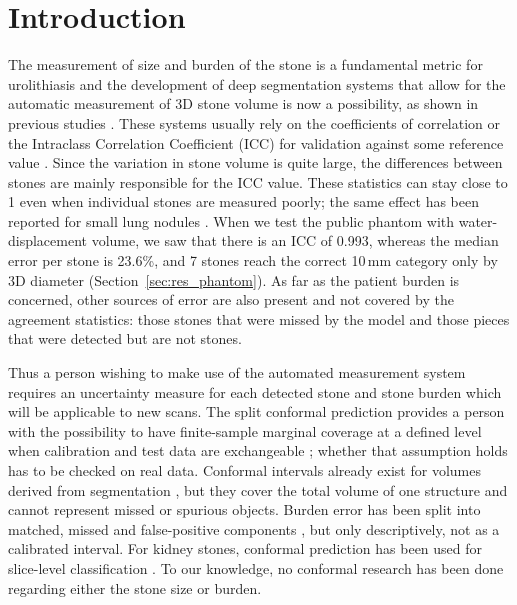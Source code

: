 \documentclass[conference]{IEEEtran}
\begin{document}
\section{Introduction}
The measurement of size and burden of the stone is a fundamental metric for urolithiasis and the development of deep segmentation systems that allow for the automatic measurement of 3D stone volume is now a possibility, as shown in previous studies \cite{elton2022,li2022,cumpanas2024,mukherjee2023}. These systems usually rely on the coefficients of correlation or the Intraclass Correlation Coefficient (ICC) for validation against some reference value \cite{neubauer2023,wilhelm2018,elton2022}. Since the variation in stone volume is quite large, the differences between stones are mainly responsible for the ICC value. These statistics can stay close to 1 even when individual stones are measured poorly; the same effect has been reported for small lung nodules \cite{xie2013}. When we test the public phantom with water-displacement volume, we saw that there is an ICC of 0.993, whereas the median error per stone is 23.6\%, and 7 stones reach the correct 10\,mm category only by 3D diameter (Section~\ref{sec:res_phantom}). As far as the patient burden is concerned, other sources of error are also present and not covered by the agreement statistics: those stones that were missed by the model and those pieces that were detected but are not stones.

Thus a person wishing to make use of the automated measurement system requires an uncertainty measure for each detected stone and stone burden which will be applicable to new scans. The split conformal prediction provides a person with the possibility to have finite-sample marginal coverage at a defined level when calibration and test data are exchangeable \cite{vovk2005,romano2019}; whether that assumption holds has to be checked on real data. Conformal intervals already exist for volumes derived from segmentation \cite{lambert2024,alijani2026,jaubert2025}, but they cover the total volume of one structure and cannot represent missed or spurious objects. Burden error has been split into matched, missed and false-positive components \cite{kataria2026}, but only descriptively, not as a calibrated interval. For kidney stones, conformal prediction has been used for slice-level classification \cite{obeten2026}. To our knowledge, no conformal research has been done regarding either the stone size or burden.
\end{document}
